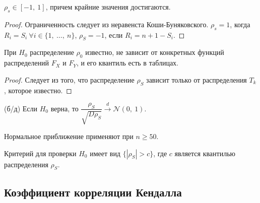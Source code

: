 \begin{proposition}
    $\displaystyle \rho _{s} \in [ -1,\ 1]$, причем крайние значения достигаются.
\end{proposition}
\begin{proof}
    Ограниченность следует из неравенста Коши-Буняковского. $\displaystyle \rho _{s} =1$, когда $\displaystyle R_{i} =S_{i} \ \forall i\in \{1,\ \dotsc ,\ n\}$, $\displaystyle \rho _{S} =-1$, если $\displaystyle R_{i} =n+1-S_{i}$.
\end{proof}
\begin{proposition}
    При $\displaystyle H_{0}$ распределение $\displaystyle \rho_{0}$ известно, не зависит от конкретных функций распределений $\displaystyle F_{X}$ и $\displaystyle F_{Y}$, и его квантиль есть в таблицах.
\end{proposition}
\begin{proof}
    Следует из того, что распределение $\displaystyle \rho _{S}$ зависит только от распределения $\displaystyle T_{k}$, которое известно.
\end{proof}
\begin{proposition}
    (б/д) Если $\displaystyle H_{0}$ верна, то $\displaystyle \dfrac{\rho _{S}}{\sqrt{D\rho _{S}}}\xrightarrow{d}\mathcal{N}( 0,\ 1)$.
\end{proposition}
\begin{note}
    Нормальное приближение применяют при $\displaystyle n\geqslant 50$.
\end{note}
Критерий для проверки $\displaystyle H_{0}$ имеет вид $\displaystyle \{| \rho _{S}|  >c\}$, где $\displaystyle c$ является квантилью распределения $\displaystyle \rho _{S}$.
\subsection{Коэффициент корреляции Кендалла}

